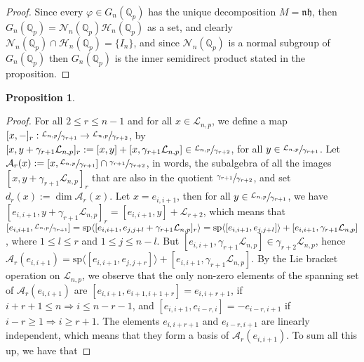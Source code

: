 \documentclass[12pt]{article}
\newtheorem{proposition}[theorem]{Proposition}
\begin{document}
\begin{proof}
Since every $\varphi\in{G_{n}(\mathbb{Q}_p)}$ has the unique decomposition $M=\mathfrak{n}\mathfrak{h}$, then $G_{n}(\mathbb{Q}_p)=\mathcal{N}_{n}(\mathbb{Q}_p)\mathcal{H}_{n}(\mathbb{Q}_p)$ as a set, and clearly $\mathcal{N}_{n}(\mathbb{Q}_p)\cap\mathcal{H}_{n}(\mathbb{Q}_p)=\{I_{n}\}$, and since $\mathcal{N}_{n}(\mathbb{Q}_p)$ is a normal subgroup of $G_{n}(\mathbb{Q}_p)$ then $G_{n}(\mathbb{Q}_p)$ is the inner semidirect product stated in the proposition.  
\end{proof}
\begin{proposition}

\end{proposition}
\begin{proof}
For all $2\leq{r}\leq{n-1}$ and for all $x\in\mathcal{L}_{n,p}$, we define a map $[x,-]_{r}:\sfrac{\mathcal{L}_{n,p}}{\gamma_{r+1}}\rightarrow\sfrac{\mathcal{L}_{n,p}}{\gamma_{r+2}}$, by $[x,y+\gamma_{r+1}\mathcal{L}_{n,p}]_{r}:=[x,y]+[x,\gamma_{r+1}\mathcal{L}_{n,p}]\in\sfrac{\mathcal{L}_{n,p}}{\gamma_{r+2}}$, for all $y\in\sfrac{\mathcal{L}_{n,p}}{\gamma_{r+1}}$. Let $\mathcal{A}_{r}(x):=[x,\sfrac{\mathcal{L}_{n,p}}{\gamma_{r+1}}]\cap\sfrac{\gamma_{r+1}}{\gamma_{r+2}}$, in words, the subalgebra of all the images $[x,y+\gamma_{r+1}\mathcal{L}_{n,p}]_{r}$ that are also in the quotient $\sfrac{\gamma_{r+1}}{\gamma_{r+2}}$, and set $d_r(x):=\dim\mathcal{A}_{r}(x)$. 
Let $x=e_{i,i+1}$, then for all $y\in\sfrac{\mathcal{L}_{n,p}}{\gamma_{r+1}}$, we have $[e_{i,i+1},y+\gamma_{r+1}\mathcal{L}_{n,p}]_{r}=[e_{i,i+1},y]+\mathcal{L}_{r+2}$, which means that $[e_{i,i+1},\sfrac{\mathcal{L}_{n,p}}{\gamma_{r+1}}]=\mathrm{sp}\langle[e_{i,i+1},e_{j,j+l}+\gamma_{r+1}\mathcal{L}_{n,p}]_{r}\rangle=\mathrm{sp}\langle[e_{i,i+1},e_{j,j+l}]\rangle+[e_{i,i+1},\gamma_{r+1}\mathcal{L}_{n,p}]$, where $1\leq{l}\leq{r}$ and $1\leq{j}\leq{n-l}$. But $[e_{i,i+1},\gamma_{r+1}\mathcal{L}_{n,p}]\in\gamma_{r+2}\mathcal{L}_{n,p}$, hence $\mathcal{A}_{r}(e_{i,i+1})=\mathrm{sp}\langle[e_{i,i+1},e_{j,j+r}]\rangle+[e_{i,i+1},\gamma_{r+1}\mathcal{L}_{n,p}]$. By the Lie bracket operation on $\mathcal{L}_{n,p}$, we observe that the only non-zero elements of the spanning set of $\mathcal{A}_{r}(e_{i,i+1})$ are $[e_{i,i+1},e_{i+1,i+1+r}]=e_{i,i+r+1}$, if $i+r+1\leq{n}\Rightarrow{i\leq{n-r-1}}$, and $[e_{i,i+1},e_{i-r,i}]=-e_{i-r,i+1}$ if $i-r\geq{1}\Rightarrow{i\geq{r+1}}$. The elements $e_{i,i+r+1}$ and $e_{i-r,i+1}$ are linearly independent, which means that they form a basis of $\mathcal{A}_{r}(e_{i,i+1})$. To sum all this up, we have that

\end{proof}
\end{document}

